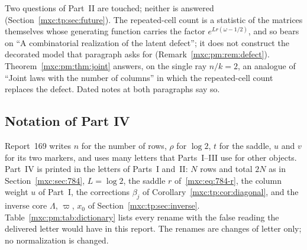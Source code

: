 \documentclass[11pt]{article}
\numberwithin{equation}{section}
\theoremstyle{definition}
\theoremstyle{remark}
\begin{document}
Two questions of Part~II are touched; neither is answered
(Section~\ref{mxc:tp:sec:future}). The repeated-cell count is a statistic of
the matrices themselves whose generating function carries the factor
$e^{Lr(\omega-1/2)}$, and so bears on ``A combinatorial realization of the
latent defect''; it does not construct the decorated model that paragraph
asks for (Remark~\ref{mxc:pm:rem:defect}). Theorem~\ref{mxc:pm:thm:joint}
answers, on the single ray $n/k=2$, an analogue of ``Joint laws with the
number of columns'' in which the repeated-cell count replaces the defect. Dated
notes at both paragraphs say so.

\subsection{Notation of Part IV}\label{mxc:pm:sec:notation}
Report~169 writes $n$ for the number of rows, $\rho$ for $\log2$, $t$ for
the saddle, $u$ and $v$ for its two markers, and uses many letters that
Parts~I--III use for other objects. Part~IV is printed in the letters of
Parts~I and~II: $N$ rows and total $2N$ as in Section~\ref{mxc:sec:784},
$L=\log2$, the saddle $r$ of~\eqref{mxc:eq:784-r}, the column weight $u$ of
Part~I, the corrections $\beta_j$ of Corollary~\ref{mxc:tp:cor:diagonal},
and the inverse core $\Lambda$, $\varpi$, $x_0$ of
Section~\ref{mxc:tp:sec:inverse}. Table~\ref{mxc:pm:tab:dictionary} lists every
rename with the false reading the delivered letter would have in this
report. The renames are changes of letter only; no normalization is changed.
\end{document}
